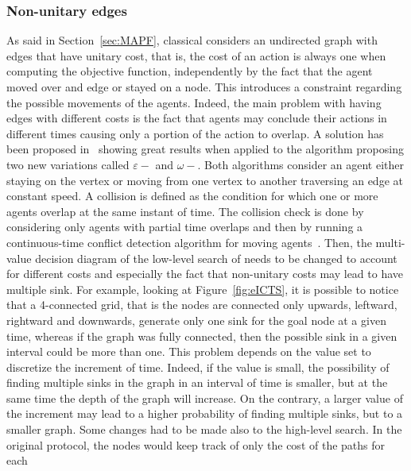 \subsubsection{Non-unitary edges}
As said in Section~\ref{sec:MAPF}, classical  considers an
undirected graph with edges that have unitary cost, that is, the cost of an
action is always one when computing the objective function, independently by
the fact that the agent moved over and edge or stayed on a node. This
introduces a constraint regarding the possible movements of the agents. Indeed,
the main problem with having edges with different costs is the fact that agents
may conclude their actions in different times causing only a portion of the
action to overlap. A solution has been proposed in~\cite{EICTS} showing great 
results when applied to the  algorithm proposing two new variations
called $\varepsilon-$ and $\omega-$. \newline
Both algorithms consider an agent either staying on the vertex or moving from
one vertex to another traversing an edge at constant speed. A collision is
defined as the condition for which one or more agents overlap at the same
instant of time. The collision check is done by considering only agents with
partial time overlaps and then by running a continuous-time conflict detection
algorithm for moving agents~\cite{collision_detection}. \newline
Then, the multi-value decision diagram of the low-level search of 
needs to be changed to account for different costs and especially the fact that
non-unitary costs may lead to have multiple sink. For example, looking at
Figure~\ref{fig:eICTS}, it is possible to notice that a 4-connected grid, that
is the nodes are connected only upwards, leftward, rightward and downwards,
generate only one sink for the goal node at a given time, whereas if the graph
was fully connected, then the possible sink in a given interval could be more
than one. This problem depends on the value set to discretize the increment of
time. Indeed, if the value is small, the possibility of finding multiple sinks
in the graph in an interval of time is smaller, but at the same time the depth
of the graph will increase. On the contrary, a larger value of the increment
may lead to a higher probability of finding multiple sinks, but to a smaller
graph. \newline
Some changes had to be made also to the high-level search. In the original
protocol, the nodes would keep track of only the cost of the paths for each
